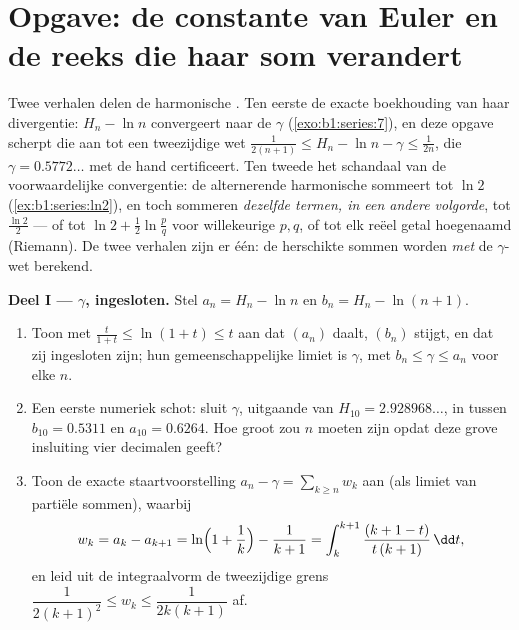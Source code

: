\section{Opgave: de constante van Euler en de reeks die haar som
verandert}

\begin{problem}[{Weekendopgave --- $H_n = \ln n + \gamma +
\frac{1}{2n} + O(n^{-2})$, en het herschikken van $1 - \frac12 +
\frac13 - \dots$ tot $\frac{\ln 2}{2}$}]
\label{pb:b1:series:1}
Twee verhalen delen de harmonische . Ten eerste de exacte
boekhouding van haar divergentie: $H_n - \ln n$ convergeert naar de
 $\gamma$ (\cref{exo:b1:series:7}), en deze
opgave scherpt die  aan tot een tweezijdige wet
$\frac{1}{2(n+1)} \leq H_n - \ln n - \gamma \leq \frac{1}{2n}$,
die $\gamma = 0.5772\dots$ met de hand certificeert. Ten tweede
het schandaal van de voorwaardelijke convergentie: de alternerende
harmonische  sommeert tot $\ln 2$ (\cref{ex:b1:series:ln2}),
en toch sommeren \emph{dezelfde termen, in een andere volgorde},
tot $\frac{\ln 2}{2}$ --- of tot $\ln 2 + \frac12\ln\frac pq$
voor willekeurige $p, q$, of tot elk reëel getal hoegenaamd
(Riemann). De twee verhalen zijn er één: de herschikte sommen
worden \emph{met} de $\gamma$-wet
berekend.

\medskip
\noindent\textbf{Deel I --- $\gamma$, ingesloten.} Stel $a_n = H_n
- \ln n$ en $b_n = H_n - \ln(n+1)$.
\begin{enumerate}
  \item Toon met $\frac{t}{1+t} \leq \ln(1 + t) \leq t$ aan dat
        $(a_n)$ daalt, $(b_n)$ stijgt, en dat zij ingesloten zijn;
        hun gemeenschappelijke limiet is $\gamma$, met $b_n \leq
        \gamma \leq a_n$ voor elke $n$.
  \item Een eerste numeriek schot: sluit $\gamma$, uitgaande van
        $H_{10} = 2.928968\dots$, in tussen $b_{10} = 0.5311$ en
        $a_{10} = 0.6264$. Hoe groot zou $n$ moeten zijn opdat deze
        grove insluiting vier decimalen geeft?
  \item Toon de exacte staartvoorstelling $a_n - \gamma = \sum_{k
        \geq n} w_k$ aan (als limiet van partiële sommen), waarbij
        \[
        w_k = a_k - a_{k+1}
        = \ln\Bigl(1 + \frac1k\Bigr) - \frac{1}{k+1}
        = \int_k^{k+1} \frac{(k + 1 - t)}{t\,(k+1)}\,\dd t ,
        \]
        en leid uit de integraalvorm de tweezijdige grens
        $\dfrac{1}{2(k+1)^2} \leq w_k \leq \dfrac{1}{2k(k+1)}$ af.
\end{enumerate}


\end{problem}
